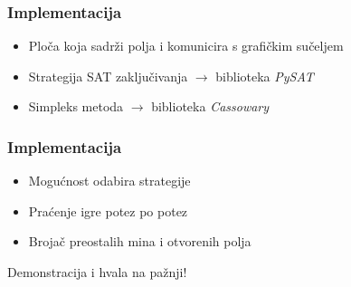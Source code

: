 \documentclass{beamer}
\begin{document}
        \begin{frame}[t]
        \frametitle{Implementacija}
        
         \begin{figure}
            \centering
        \end{figure}

      \begin{itemize}
            \item<2-> Ploča koja sadrži polja i komunicira s grafičkim sučeljem
            \item<3-> Strategija SAT zaključivanja $\rightarrow$ biblioteka \textit{PySAT}
            \item<4-> Simpleks metoda $\rightarrow$ biblioteka \textit{Cassowary}
        \end{itemize}
    \end{frame}
    
      \begin{frame}[t]
        \frametitle{Implementacija}
        
         \begin{figure}
            \centering
        \end{figure}

      \begin{itemize}
            \item<2-> Mogućnost odabira strategije
            \item<3-> Praćenje igre potez po potez
            \item<4-> Brojač preostalih mina i otvorenih polja
        \end{itemize}
    \end{frame}

    \begin{frame}[standout]
        Demonstracija i hvala na pažnji!
    \end{frame}
\end{document}
